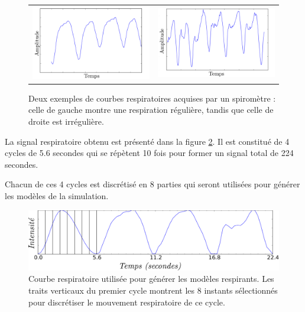 \begin{figure}
 \centering
 \begin{tabular}{c c}
 \includegraphics[width=8cm]{images/respiReguliere} &
 \includegraphics[width=8cm]{images/respiIrreguliere}
 \end{tabular}
 \caption[Exemple de courbes respiratoires régulière et irrégulière]{Deux exemples de courbes respiratoires acquises par un spiromètre : celle de gauche montre une respiration régulière, tandis que celle de droite est irrégulière.}
 \label{fig:variabCycle}
\end{figure}


La signal respiratoire obtenu est présenté dans la figure \ref{fig:cycleRespi}. Il est constitué de 4 cycles de 5.6 secondes qui se répètent 10 fois pour former un signal total de 224 secondes. 

Chacun de ces 4 cycles est discrétisé en 8 parties qui seront utilisées pour générer les modèles de la simulation. 


\begin{figure}
 \centering
 \includegraphics[width=12cm]{images/courbesRespi}

 \caption[signal respiratoire utilisé pour les modèles de la base de données]{Courbe respiratoire utilisée pour générer les modèles respirants. Les traits verticaux du premier cycle montrent les 8 instants sélectionnés pour discrétiser le mouvement respiratoire de ce cycle.}
 \label{fig:cycleRespi}
\end{figure}

